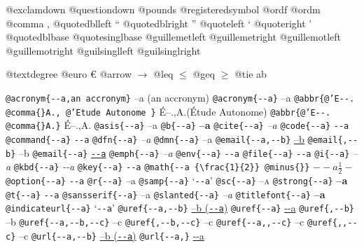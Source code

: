 \documentclass{book}
\begin{document}
@exclamdown \textexclamdown{}
@questiondown \textquestiondown{}
@pounds \textsterling{}
@registeredsymbol \circledR{}
@ordf \textordfeminine{}
@ordm \textordmasculine{}
@comma ,
@quotedblleft \textquotedblleft{}
@quotedblright \textquotedblright{}
@quoteleft \textquoteleft{}
@quoteright \textquoteright{}
@quotedblbase \quotedblbase{}
@quotesinglbase \quotesinglbase{}
@guillemetleft \guillemotleft{}
@guillemetright \guillemotright{}
@guillemotleft \guillemotleft{}
@guillemotright \guillemotright{}
@guilsinglleft \guilsinglleft{}
@guilsinglright \guilsinglright{}

@textdegree \textdegree{}
@euro \euro{}
@arrow $\rightarrow{}$
@leq $\leq{}$
@geq $\geq{}$
@tie a\hbox{}b

\texttt{@acronym\{{-}{-}a,an accronym\}} --a (an accronym)
\texttt{@acronym\{{-}{-}a\}} --a
\texttt{@abbr\{@'E{-}{-}. @comma\{\}A., @'Etude Autonome \}} \'{E}--.\@ ,A.\@ (\'{E}tude Autonome)
\texttt{@abbr\{@'E{-}{-}. @comma\{\}A.\}} \'{E}--.\@ ,A.\@
\texttt{@asis\{{-}{-}a\}} --a
\texttt{@b\{{-}{-}a\}} \textbf{--a}
\texttt{@cite\{{-}{-}a\}} \textsl{--a}
\texttt{@code\{{-}{-}a\}} \texttt{{-}{-}a}
\texttt{@command\{{-}{-}a\}} \texttt{{-}{-}a}
\texttt{@dfn\{{-}{-}a\}} \textsl{--a}
\texttt{@dmn\{{-}{-}a\}} \thinspace --a
\texttt{@email\{{-}{-}a,{-}{-}b\}} \href{mailto:--a}{--b}
\texttt{@email\{,{-}{-}b\}} --b
\texttt{@email\{{-}{-}a\}} \href{mailto:--a}{\nolinkurl{--a}}
\texttt{@emph\{{-}{-}a\}} \emph{--a}
\texttt{@env\{{-}{-}a\}} \texttt{{-}{-}a}
\texttt{@file\{{-}{-}a\}} \texttt{{-}{-}a}
\texttt{@i\{{-}{-}a\}} \textit{--a}
\texttt{@kbd\{{-}{-}a\}} {\ttfamily\textsl{{-}{-}a}}
\texttt{@key\{{-}{-}a\}} \texttt{{-}{-}a}
\texttt{@math\{{-}{-}a \{\textbackslash{}frac\{1\}\{2\}\} @minus\{\}\}} $--a {\frac{1}{2}} -$
\texttt{@option\{{-}{-}a\}} \texttt{{-}{-}a}
\texttt{@r\{{-}{-}a\}} \textnormal{--a}
\texttt{@samp\{{-}{-}a\}} `\texttt{{-}{-}a}'
\texttt{@sc\{{-}{-}a\}} \textsc{--a}
\texttt{@strong\{{-}{-}a\}} \textbf{--a}
\texttt{@t\{{-}{-}a\}} \texttt{{-}{-}a}
\texttt{@sansserif\{{-}{-}a\}} \textsf{--a}
\texttt{@slanted\{{-}{-}a\}} \textsl{--a}
\texttt{@titlefont\{{-}{-}a\}} {\huge \bfseries --a}
\texttt{@indicateurl\{{-}{-}a\}} `\texttt{{-}{-}a}'
\texttt{@uref\{{-}{-}a,{-}{-}b\}} \href{--a}{--b (\nolinkurl{--a})}
\texttt{@uref\{{-}{-}a\}} \url{--a}
\texttt{@uref\{,{-}{-}b\}} --b
\texttt{@uref\{{-}{-}a,{-}{-}b,{-}{-}c\}} --c
\texttt{@uref\{,{-}{-}b,{-}{-}c\}} --c
\texttt{@uref\{{-}{-}a,,{-}{-}c\}} --c
\texttt{@uref\{,,{-}{-}c\}} --c
\texttt{@url\{{-}{-}a,{-}{-}b\}} \href{--a}{--b (\nolinkurl{--a})}
\texttt{@url\{{-}{-}a,\}} \url{--a}
\end{document}
